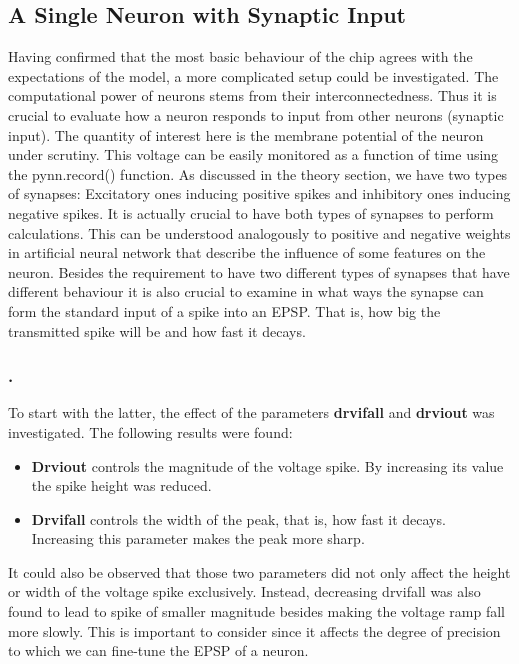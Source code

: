 \documentclass[10pt,a4paper]{article}
\begin{document}
\subsection{A Single Neuron with Synaptic Input}
Having confirmed that the most basic behaviour of the chip agrees with the
expectations of the model,  a more complicated setup could be investigated.
The computational power of neurons stems from their interconnectedness.  Thus it
is crucial to evaluate how a neuron responds to input from other neurons
(synaptic input).  The quantity of interest here is the membrane potential of
the neuron under scrutiny.  This voltage can be easily monitored as a function
of time using the pynn.record() function.  As discussed in the theory section,
we have two types of synapses: Excitatory ones inducing positive spikes and
inhibitory ones inducing negative spikes.  It is actually crucial to have both
types of synapses to perform calculations.  This can be understood analogously
to positive and negative weights in artificial neural network that describe the
influence of some features on the neuron.  Besides the requirement to have two
different types of synapses that have different behaviour it is also crucial to
examine in what ways the synapse can form the standard input of a spike into
an EPSP.  That is,  how big the transmitted spike will be and how fast it decays.

\subsubsection{.}
To start with the latter,  the effect of the parameters \textbf{drvifall} and
\textbf{drviout} was investigated.  The following results were found:
\begin{itemize}
	\item \textbf{Drviout} controls the magnitude of the voltage spike.  By
	increasing its value the spike height was reduced.
	\item \textbf{Drvifall} controls the width of the peak, that is,  how fast
	it decays.  Increasing this parameter makes the peak more sharp.
\end{itemize}
It could also be observed that those two parameters did not only affect the
height or width of the voltage spike exclusively.  Instead,  decreasing drvifall
was also found to lead to spike of smaller magnitude besides making the
voltage ramp fall more slowly.  This is important to consider since it affects
the degree of precision to which we can fine-tune the EPSP of a neuron.
\end{document}

